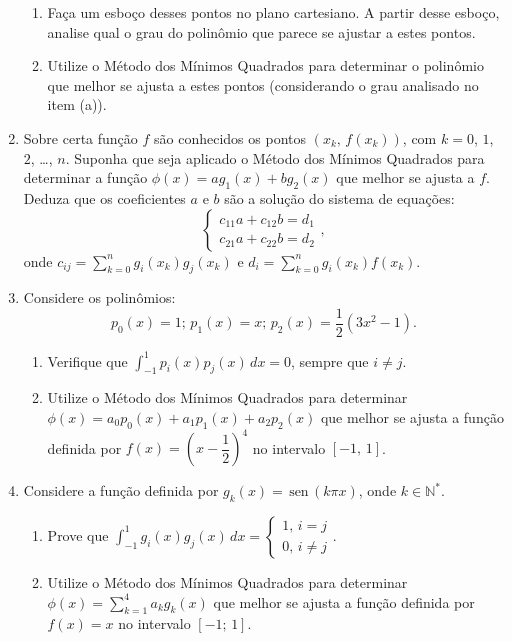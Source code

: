 \documentclass[12pt,a4paper]{article}
\newcommand{\sen}{\,\textrm{sen}\,}
\begin{document}
\begin{enumerate}
   \begin{enumerate}
    \item Faça um esboço desses pontos no plano cartesiano. A partir desse esboço, analise qual o grau do polinômio que 
          parece se ajustar a estes pontos.
    \item Utilize o Método dos Mínimos Quadrados para determinar o polinômio que melhor se ajusta a estes pontos (considerando o grau analisado
          no item (a)).
   \end{enumerate}

   \item Sobre certa função $f$ são conhecidos os pontos $(x_k,\,f(x_k))$, com $k=0$, $1$, $2$, \ldots, $n$. Suponha que seja 
aplicado o Método dos Mínimos Quadrados para determinar a função $\phi(x) = ag_1(x) + bg_2(x)$ que melhor se ajusta a $f$. Deduza que os coeficientes $a$ e 
$b$ são a solução do sistema de equações:
$$\begin{cases}
   c_{11}a + c_{12}b = d_1 \\
   c_{21}a + c_{22}b = d_2
  \end{cases},
$$
onde $\displaystyle c_{ij} = \sum_{k=0}^n g_i(x_k)g_j(x_k)$ e $\displaystyle d_{i} = \sum_{k=0}^n g_i(x_k)f(x_k)$.

   \item Considere os polinômios:
   $$p_0(x) = 1;\, p_1(x) = x;\,p_2(x) = \frac{1}{2}(3x^2 - 1).$$

   \begin{enumerate}
    \item Verifique que $\displaystyle\int_{-1}^1 p_i(x)p_j(x)\,dx = 0$, sempre que $i\neq j$.
    \item Utilize o Método dos Mínimos Quadrados para determinar $\phi(x) = a_0p_0(x) + a_1p_1(x) + a_2p_2(x)$ que melhor se ajusta a função definida por 
          $f(x) = \left(x - \dfrac{1}{2}\right)^4$ no intervalo $[-1,\, 1]$.
   \end{enumerate}

 \item Considere a função definida por $g_k(x)=\sen(k\pi x)$, onde $k\in\mathbb{N}^*$.

   \begin{enumerate}
    \item Prove que $\displaystyle\int_{-1}^1 g_i(x)g_j(x)\,dx = \begin{cases}1,\,i = j \\ 0,\,i\neq j\end{cases}$.
    \item Utilize o Método dos Mínimos Quadrados para determinar $\displaystyle \phi(x) = \sum_{k=1}^4 a_kg_k(x)$ que melhor se ajusta a função definida por 
          $f(x) = x$ no intervalo $[-1;\, 1]$.
   \end{enumerate}


\end{enumerate}
\end{document}
